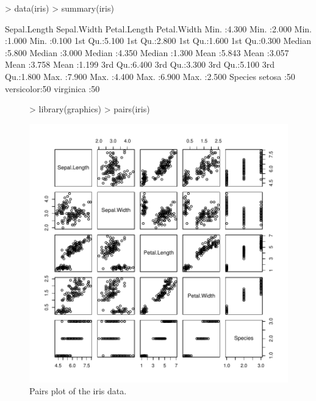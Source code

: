 \documentclass[a4paper]{article}
\begin{document}
\begin{Schunk}
\begin{Sinput}
> data(iris)
> summary(iris)
\end{Sinput}
\begin{Soutput}
  Sepal.Length    Sepal.Width     Petal.Length    Petal.Width   
 Min.   :4.300   Min.   :2.000   Min.   :1.000   Min.   :0.100  
 1st Qu.:5.100   1st Qu.:2.800   1st Qu.:1.600   1st Qu.:0.300  
 Median :5.800   Median :3.000   Median :4.350   Median :1.300  
 Mean   :5.843   Mean   :3.057   Mean   :3.758   Mean   :1.199  
 3rd Qu.:6.400   3rd Qu.:3.300   3rd Qu.:5.100   3rd Qu.:1.800  
 Max.   :7.900   Max.   :4.400   Max.   :6.900   Max.   :2.500  
       Species  
 setosa    :50  
 versicolor:50  
 virginica :50  
\end{Soutput}
\end{Schunk}


\begin{figure}[htbp]
  \begin{center}
\begin{Schunk}
\begin{Sinput}
> library(graphics)
> pairs(iris)
\end{Sinput}
\end{Schunk}
\includegraphics{Sweave-test-1-006}
    \caption{Pairs plot of the iris data.}
  \end{center}
\end{figure}
\end{document}
